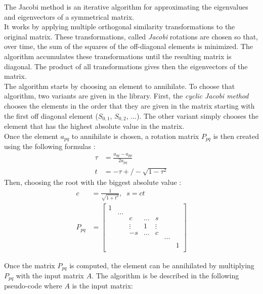 \documentclass{book}
\begin{document}
The Jacobi method is an iterative algorithm for approximating the eigenvalues and eigenvectors of a symmetrical matrix. \\

It works by applying multiple orthogonal similarity transformations to the original matrix. These transformations, called \textit{Jacobi} rotations are chosen so that, over time, the sum of the squares of the off-diagonal elements is minimized. The algorithm accumulates these transformations until the resulting matrix is diagonal. The product of all transformations gives then the eigenvectors of the matrix. \\

The algorithm starts by choosing an element to annihilate. To choose that algorithm, two variants are given in the library. First, the \textit{cyclic Jacobi method} chooses the elements in the order that they are given in the matrix starting with the first off diagonal element ($S_{0,1}$, $S_{0,2}$, ...). The other variant simply chooses the element that has the highest absolute value in the matrix. \\

Once the element $a_{pq}$ to annihilate is chosen, a rotation matrix $P_{pq}$ is then created using the following formulas :
\begin{align*}
    \tau &= \frac{a_{qq} - a_{pp}}{2a_{pq}} \\
    t &= -\tau +/- \sqrt{1 - \tau^2}
\end{align*}
Then, choosing the root with the biggest absolute value :
\begin{align*}
    c &= \frac{1}{\sqrt{1 + t^2}}, \; \; s = ct \\
    P_{pq} &=
        \begin{bmatrix}
            1 & & & & & & \\
            & \ldots & & & & & \\
            & & c & \ldots & s & \\
            & & \vdots & 1 & \vdots & \\
            & & -s & \ldots & c & \\
            & & & & & \ldots & \\
            & & & & & & 1 \\
        \end{bmatrix}
\end{align*}

Once the matrix $P_{pq}$ is computed, the element can be annihilated by multiplying $P_{pq}$ with the input matrix $A$. The algorithm is be described in the following pseudo-code where $A$ is the input matrix: \\
\end{document}
